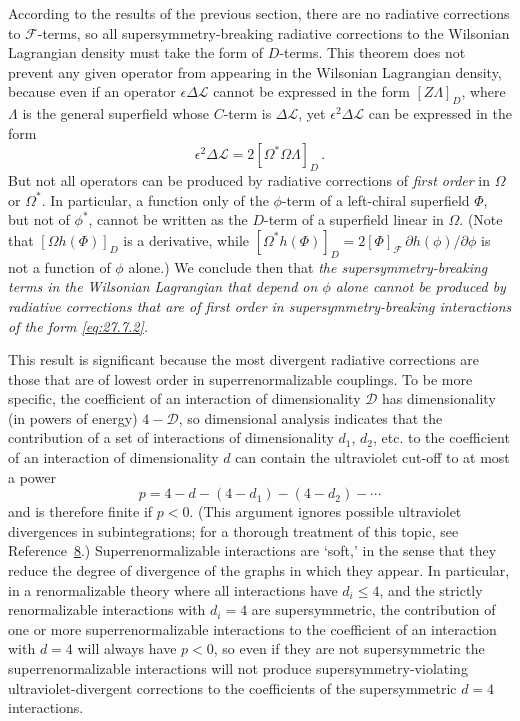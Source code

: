 According to the results of the previous section, there are no radiative
corrections to \(\mathcal{F}\)-terms, so all supersymmetry-breaking radiative
corrections to the Wilsonian Lagrangian density must take the form of
\(D\)-terms. This theorem does not prevent any given operator from appearing
in the Wilsonian Lagrangian density, because even if an operator
\(\epsilon\Delta\mathcal{L}\) cannot be expressed in the form
\([Z\Lambda]_D\), where \(\Lambda\) is the general superfield whose
\(C\)-term is \(\Delta\mathcal{L}\), yet \(\epsilon^2\Delta\mathcal{L}\)
can be expressed in the form
\begin{equation}
  \epsilon^2\Delta\mathcal{L}
  =2[\Omega^*\Omega\Lambda]_D\,.
  \tag{27.7.3}\label{eq:27.7.3}
\end{equation}
But not all operators can be produced by radiative corrections of
\emph{first order} in \(\Omega\) or \(\Omega^*\). In particular, a function
only of the \(\phi\)-term of a left-chiral superfield \(\Phi\), but not of
\(\phi^*\), cannot be written as the \(D\)-term of a superfield linear in
\(\Omega\). (Note that \([\Omega h(\Phi)]_D\) is a derivative, while
\([\Omega^*h(\Phi)]_D
=2[\Phi]_{\mathcal{F}}\,\partial h(\phi)/\partial\phi\) is not a function
of \(\phi\) alone.) We conclude then that \emph{the
supersymmetry-breaking terms in the Wilsonian Lagrangian that depend on
\(\phi\) alone cannot be produced by radiative corrections that are of first
order in supersymmetry-breaking interactions of the form
\eqref{eq:27.7.2}.}

This result is significant because the most divergent radiative corrections
are those that are of lowest order in superrenormalizable couplings. To be
more specific, the coefficient of an interaction of dimensionality
\(\mathcal{D}\) has dimensionality (in powers of energy)
\(4-\mathcal{D}\), so dimensional analysis indicates that the contribution
of a set of interactions of dimensionality \(d_1\), \(d_2\), etc. to the
coefficient of an interaction of dimensionality \(d\) can contain the
ultraviolet cut-off to at most a power
\begin{equation}
  p=4-d-(4-d_1)-(4-d_2)-\cdots
  \tag{27.7.4}\label{eq:27.7.4}
\end{equation}
and is therefore finite if \(p<0\). (This argument ignores possible
ultraviolet divergences in subintegrations; for a thorough treatment of this
topic, see Reference~\hyperref[ch27-ref-8]{8}.) Superrenormalizable
interactions are `soft,' in the sense that they reduce the degree of
divergence of the graphs in which they appear. In particular, in a
renormalizable theory where all interactions have \(d_i\leq4\), and the
strictly renormalizable interactions with \(d_i=4\) are supersymmetric, the
contribution of one or more superrenormalizable interactions to the
coefficient of an interaction with \(d=4\) will always have \(p<0\), so even
if they are not supersymmetric the superrenormalizable interactions will not
produce supersymmetry-violating ultraviolet-divergent corrections to the
coefficients of the supersymmetric \(d=4\) interactions.

